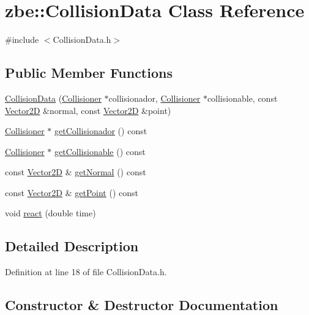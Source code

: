 \hypertarget{classzbe_1_1_collision_data}{}\section{zbe\+:\+:Collision\+Data Class Reference}
\label{classzbe_1_1_collision_data}


{\ttfamily \#include $<$Collision\+Data.\+h$>$}

\subsection*{Public Member Functions}
\begin{DoxyCompactItemize}
\item 
\hyperlink{classzbe_1_1_collision_data_ada63380ed483198d18360c86bd767ab9}{Collision\+Data} (\hyperlink{classzbe_1_1_collisioner}{Collisioner} $\ast$collisionador, \hyperlink{classzbe_1_1_collisioner}{Collisioner} $\ast$collisionable, const \hyperlink{classzbe_1_1_vector2_d}{Vector2\+D} \&normal, const \hyperlink{classzbe_1_1_vector2_d}{Vector2\+D} \&point)
\item 
\hyperlink{classzbe_1_1_collisioner}{Collisioner} $\ast$ \hyperlink{classzbe_1_1_collision_data_ade8ae07a020fe3998a0b86332da2a316}{get\+Collisionador} () const 
\item 
\hyperlink{classzbe_1_1_collisioner}{Collisioner} $\ast$ \hyperlink{classzbe_1_1_collision_data_a2c7909dde4916bc03e85a5f5e7573670}{get\+Collisionable} () const 
\item 
const \hyperlink{classzbe_1_1_vector2_d}{Vector2\+D} \& \hyperlink{classzbe_1_1_collision_data_af023c2b6de52939f6a2388da30d3d6b2}{get\+Normal} () const 
\item 
const \hyperlink{classzbe_1_1_vector2_d}{Vector2\+D} \& \hyperlink{classzbe_1_1_collision_data_ac78b947b89aacd31f322d367c3348d83}{get\+Point} () const 
\item 
void \hyperlink{classzbe_1_1_collision_data_a7c80356481445bfb621413cfac43a0a4}{react} (double time)
\end{DoxyCompactItemize}


\subsection{Detailed Description}


Definition at line 18 of file Collision\+Data.\+h.



\subsection{Constructor \& Destructor Documentation}
\hypertarget{classzbe_1_1_collision_data_ada63380ed483198d18360c86bd767ab9}{}
